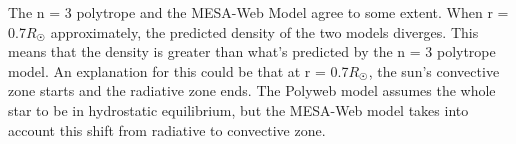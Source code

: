 \documentclass[10pt]{article}
\begin{document}
The n = 3 polytrope and the MESA-Web Model agree to some extent. When r = 0.7$R_{\astrosun}$ approximately, the predicted density of the two models diverges. This means that the density is greater than what's predicted by the n = 3 polytrope model. An explanation for this could be that at r = 0.7$R_{\astrosun}$, the sun's convective zone starts and the radiative zone ends. The Polyweb model assumes the whole star to be in hydrostatic equilibrium, but the MESA-Web model takes into account this shift from radiative to convective zone.
\end{document}
